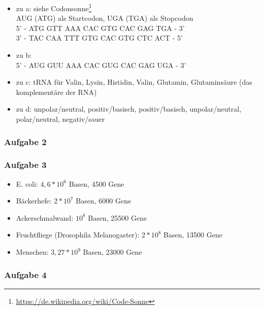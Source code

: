 \begin{itemize}
	\item zu a: siehe Codonsonne\footnote{\url{https://de.wikipedia.org/wiki/Code-Sonne}}\\
		AUG (ATG) als Startcodon, UGA (TGA) als Stopcodon\\
		5' - ATG GTT AAA CAC GTG CAC GAG TGA - 3'\\
		3' - TAC CAA TTT GTG CAC GTG CTC ACT - 5'
	\item zu b:\\
		5' - AUG GUU AAA CAC GUG CAC GAG UGA - 3'
	\item zu c: tRNA für Valin, Lysin, Histidin, Valin, Glutamin, Glutaminsäure (das komplementäre der RNA)
	\item zu d: unpolar/neutral, positiv/basisch, positiv/basisch, unpolar/neutral, polar/neutral, negativ/sauer
	
\end{itemize}

\subsubsection{Aufgabe 2}

\subsubsection{Aufgabe 3}

\begin{itemize}
	\item E. coli: $4,6*10^6$ Basen, 4500 Gene
	\item Bäckerhefe: $2*10^7$ Basen, 6000 Gene
	\item Ackerschmalwand: $10^8$ Basen, 25500 Gene
	\item Fruchtfliege (Drosophila Melanogaster): $2*10^8$ Basen, 13500 Gene
	\item Menschen: $3,27 * 10^9$ Basen, 23000 Gene
\end{itemize}

\subsubsection{Aufgabe 4}

